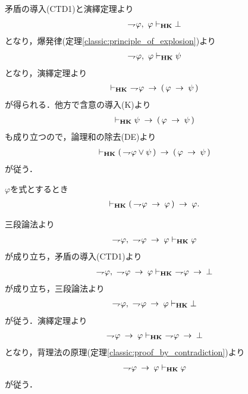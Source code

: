 	\begin{sketch}
		矛盾の導入(CTD1)と演繹定理より
		\begin{align}
			\negation \varphi,\ \varphi \provable{\mbox{{\bf HK}}} \bot 
		\end{align}
		となり，爆発律(定理\ref{classic:principle_of_explosion})より
		\begin{align}
			\negation \varphi,\ \varphi \provable{\mbox{{\bf HK}}} \psi
		\end{align}
		となり，演繹定理より
		\begin{align}
			\provable{\mbox{{\bf HK}}}\ \negation \varphi \rarrow 
			(\, \varphi \rarrow \psi\, )
		\end{align}
		が得られる．他方で含意の導入(K)より
		\begin{align}
			\provable{\mbox{{\bf HK}}} \psi \rarrow (\, \varphi \rarrow \psi\, )
		\end{align}
		も成り立つので，論理和の除去(DE)より
		\begin{align}
			\provable{\mbox{{\bf HK}}} (\, \negation \varphi \vee \psi\, ) 
			\rarrow (\, \varphi \rarrow \psi\, )
		\end{align}
		が従う．
		\QED
	\end{sketch}
	
	\begin{screen}
		\begin{thm}[驚嘆すべき帰結]\label{classic:consequentia_mirabilis}
			$\varphi$を式とするとき
			\begin{align}
				\provable{\mbox{{\bf HK}}} 
				(\, \negation \varphi \rarrow \varphi\, ) \rarrow \varphi.
			\end{align}
		\end{thm}
	\end{screen}
	
	\begin{sketch}
		三段論法より
		\begin{align}
			\negation \varphi,\ \negation \varphi \rarrow \varphi
			\provable{\mbox{{\bf HK}}} \varphi
		\end{align}
		が成り立ち，矛盾の導入(CTD1)より
		\begin{align}
			\negation \varphi,\ \negation \varphi \rarrow \varphi
			\provable{\mbox{{\bf HK}}}\ \negation \varphi \rarrow \bot
		\end{align}
		が成り立ち，三段論法より
		\begin{align}
			\negation \varphi,\ \negation \varphi \rarrow \varphi
			\provable{\mbox{{\bf HK}}} \bot
		\end{align}
		が従う．演繹定理より
		\begin{align}
			\negation \varphi \rarrow \varphi
			\provable{\mbox{{\bf HK}}}\ \negation \varphi \rarrow \bot
		\end{align}
		となり，背理法の原理(定理\ref{classic:proof_by_contradiction})より
		\begin{align}
			\negation \varphi \rarrow \varphi
			\provable{\mbox{{\bf HK}}} \varphi
		\end{align}
		が従う．
		\QED
	\end{sketch}
	
